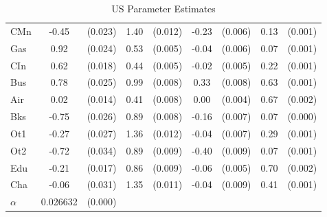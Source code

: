 \documentclass[11pt]{article}
\begin{document}
\begin{CJK}{UTF8}{gbsn}
\begin{table}[!ht]
\begin{tabular}{lcccccccc}
        CMn & -0.45 &  (0.023) & 1.40 & (0.012) & -0.23 & (0.006) & 0.13 & (0.001)\\ 
        Gas &  0.92 &  (0.024) & 0.53 & (0.005) & -0.04 & (0.006) & 0.07 & (0.001)\\ 
        CIn &  0.62 &  (0.018) & 0.44 & (0.005) & -0.02 & (0.005) & 0.22 & (0.001)\\ 
        Bus &  0.78 &  (0.025) & 0.99 & (0.008) &  0.33 & (0.008) & 0.63 & (0.001)\\ 
        Air &  0.02 &  (0.014) & 0.41 & (0.008) &  0.00 & (0.004) & 0.67 & (0.002)\\ 
        Bks & -0.75 &  (0.026) & 0.89 & (0.008) & -0.16 & (0.007) & 0.07 & (0.000)\\ 
        Ot1 & -0.27 &  (0.027) & 1.36 & (0.012) & -0.04 & (0.007) & 0.29 & (0.001)\\ 
        Ot2 & -0.72 &  (0.034) & 0.89 & (0.009) & -0.40 & (0.009) & 0.07 & (0.001)\\ 
        Edu & -0.21 &  (0.017) & 0.86 & (0.009) & -0.06 & (0.005) & 0.70 & (0.002)\\ 
        Cha & -0.06 &  (0.031) & 1.35 & (0.011) & -0.04 & (0.009) & 0.41 & (0.001)\\ 
         \hline
        $\alpha$ & 0.026632 & (0.000) & & & & \\
        \hline
    \end{tabular}
    \caption{US Parameter Estimates}
    \label{tab:parest}
\end{table}


\end{CJK}
\end{document}
